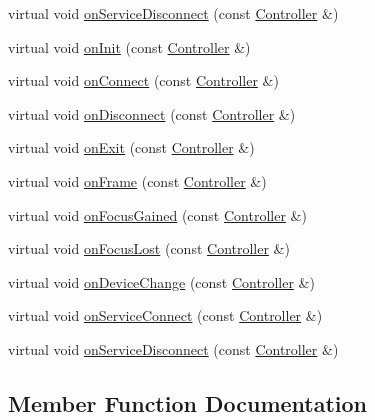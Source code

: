 \begin{DoxyCompactItemize}
\item 
virtual void \hyperlink{class_sample_listener_afb2cf676f82cb7df58052085ecc64dd1}{on\+Service\+Disconnect} (const \hyperlink{class_leap_1_1_controller}{Controller} \&)
\item 
virtual void \hyperlink{class_sample_listener_ab2a418fbd9bd0da82f47e0e9b3149b38}{on\+Init} (const \hyperlink{class_leap_1_1_controller}{Controller} \&)
\item 
virtual void \hyperlink{class_sample_listener_afb49688d9bcf7e71a7841c70a6baab1d}{on\+Connect} (const \hyperlink{class_leap_1_1_controller}{Controller} \&)
\item 
virtual void \hyperlink{class_sample_listener_ade7366cefc72f74663f892c2c97b7554}{on\+Disconnect} (const \hyperlink{class_leap_1_1_controller}{Controller} \&)
\item 
virtual void \hyperlink{class_sample_listener_affb615dc62b6936718c40497e819adb7}{on\+Exit} (const \hyperlink{class_leap_1_1_controller}{Controller} \&)
\item 
virtual void \hyperlink{class_sample_listener_a9ae2f07da65353a8bda75c6807ecee35}{on\+Frame} (const \hyperlink{class_leap_1_1_controller}{Controller} \&)
\item 
virtual void \hyperlink{class_sample_listener_afd74ae8efc625ef62985d9d0fa33290c}{on\+Focus\+Gained} (const \hyperlink{class_leap_1_1_controller}{Controller} \&)
\item 
virtual void \hyperlink{class_sample_listener_a9510c508c13ed2ce6afe224dca483e0b}{on\+Focus\+Lost} (const \hyperlink{class_leap_1_1_controller}{Controller} \&)
\item 
virtual void \hyperlink{class_sample_listener_a4030bfba07f6a34dabf77459968acd39}{on\+Device\+Change} (const \hyperlink{class_leap_1_1_controller}{Controller} \&)
\item 
virtual void \hyperlink{class_sample_listener_a52b985b9f9a2db11b99fba2af3c3b6a6}{on\+Service\+Connect} (const \hyperlink{class_leap_1_1_controller}{Controller} \&)
\item 
virtual void \hyperlink{class_sample_listener_a60f017a145fbad1dd41b1d171a7a8c69}{on\+Service\+Disconnect} (const \hyperlink{class_leap_1_1_controller}{Controller} \&)
\end{DoxyCompactItemize}


\subsection{Member Function Documentation}
\mbox{\label{class_sample_listener_afb49688d9bcf7e71a7841c70a6baab1d}} 
